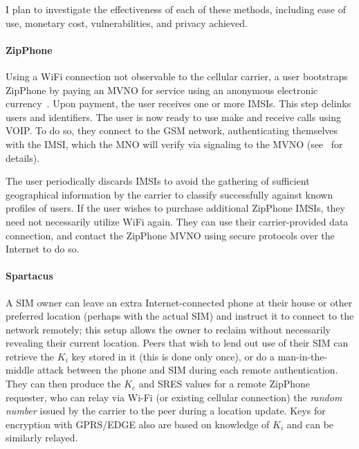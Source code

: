 I plan to investigate the effectiveness of each of these methods, including ease of use, monetary cost, vulnerabilities, and privacy achieved. 

\paragraph*{ZipPhone}
Using a WiFi connection not observable to the cellular 
carrier, a user bootstraps ZipPhone by paying an MVNO for service using an anonymous electronic 
currency~\cite{Ben-Sasson:2014,Miers:2013,Bissias:2014}. Upon payment, the user receives 
one or more IMSIs. This step delinks users and identifiers. 
The user is now ready to use make and receive calls using VOIP. To do so, 
they connect to the GSM network, authenticating themselves with the IMSI, 
which the MNO will verify via signaling to the MVNO (see~\cite{sung:2014} 
for details).

The user periodically discards IMSIs to avoid the gathering  of 
sufficient geographical information by the carrier to classify successfully against 
known profiles of users.  If the user wishes to purchase additional 
ZipPhone IMSIs, they need not necessarily utilize WiFi again. They can 
use their carrier-provided data connection, and contact the ZipPhone 
MVNO using secure protocols over the Internet to do so.

\paragraph*{Spartacus}
A SIM owner can leave an extra Internet-connected phone at their house or other
preferred location (perhaps with the actual SIM) and instruct it to
connect to the network remotely; this setup allows the owner to
reclaim without necessarily revealing their current location. 
Peers that wish to lend out use of their SIM can retrieve the $K_i$
key stored in it (this is done only once), or do a man-in-the-middle attack between the phone and SIM during each remote authentication. They can then
produce the $K_c$ and SRES values for a remote ZipPhone requester, who
can relay via Wi-Fi (or existing cellular connection) the {\em random number} issued by the carrier to the peer during a location update. Keys 
for encryption with GPRS/EDGE also are based on knowledge of $K_i$ and can be similarly relayed.

